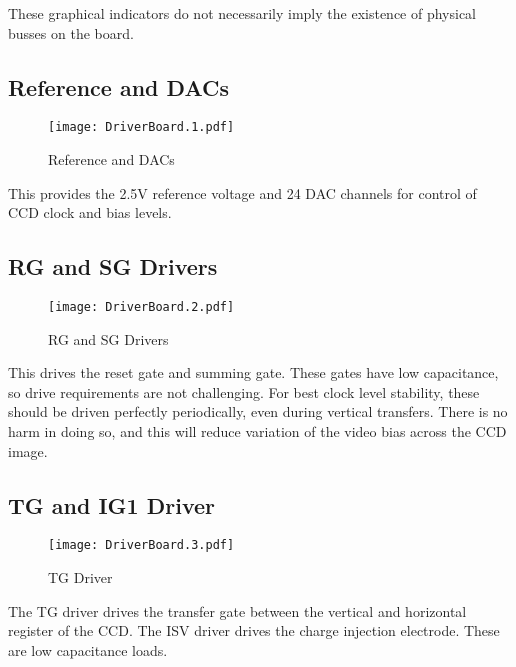 These graphical indicators do not necessarily imply the existence of physical busses on the board.

\subsection{Reference and DACs}
   \begin{figure}
   \begin{center}
   \texttt{[image: DriverBoard.1.pdf]}
   \end{center}
   \caption{Reference and DACs}
   \end{figure}
   
This provides the 2.5V reference voltage and 24 DAC channels for control of CCD clock and bias levels.
  


\subsection{RG and SG Drivers}
   \begin{figure}
   \begin{center}
   \texttt{[image: DriverBoard.2.pdf]}
   \end{center}
   \caption{RG and SG Drivers}
   \end{figure}

This drives the reset gate and summing gate. These gates have low capacitance, so drive requirements are not challenging. For best clock level stability, these should be driven perfectly periodically, even during vertical transfers. There is no harm in doing so, and this will reduce variation of the video bias across the CCD image.
  


\subsection{TG and IG1 Driver}
   \begin{figure}
   \begin{center}
   \texttt{[image: DriverBoard.3.pdf]}
   \end{center}
   \caption{TG Driver}
   \end{figure}
   
The TG driver drives the transfer gate between the vertical and horizontal register of the CCD. The ISV driver drives the charge injection electrode. These are low capacitance loads.
  


